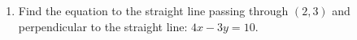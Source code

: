 \renewcommand{\theequation}{\theenumi}
\renewcommand{\thefigure}{\theenumi}
\begin{enumerate}[label=\thesubsection.\arabic*.,ref=\thesubsection.\theenumi]
%
\item Find the equation to the straight line passing through $(2,3)$ and perpendicular to the straight line: $4x-3y=10$.
%
\\
\solution

\end{enumerate}
